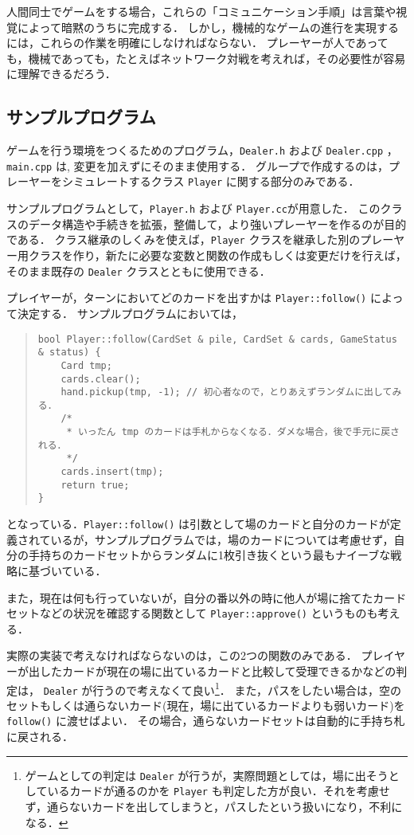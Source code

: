 人間同士でゲームをする場合，これらの「コミュニケーション手順」は言葉や視覚によって暗黙のうちに完成する．
しかし，機械的なゲームの進行を実現するには，これらの作業を明確にしなければならない．
プレーヤーが人であっても，機械であっても，たとえばネットワーク対戦を考えれば，その必要性が容易に理解できるだろう．


\subsection*{サンプルプログラム}
ゲームを行う環境をつくるためのプログラム，\verb+Dealer.h+ および \verb+Dealer.cpp+ ，\verb+main.cpp+ は, 変更を加えずにそのまま使用する．
グループで作成するのは，プレーヤーをシミュレートするクラス \verb+Player+ に関する部分のみである．

サンプルプログラムとして，\verb+Player.h+ および \verb+Player.cc+が用意した．
このクラスのデータ構造や手続きを拡張，整備して，より強いプレーヤーを作るのが目的である．
クラス継承のしくみを使えば，\verb+Player+ クラスを継承した別のプレーヤー用クラスを作り，新たに必要な変数と関数の作成もしくは変更だけを行えば，そのまま既存の \verb+Dealer+ クラスとともに使用できる．

プレイヤーが，ターンにおいてどのカードを出すかは \verb+Player::follow()+ によって決定する．
サンプルプログラムにおいては，
\begin{quote}
\begin{verbatim}
bool Player::follow(CardSet & pile, CardSet & cards, GameStatus & status) {
	Card tmp;
	cards.clear();
	hand.pickup(tmp, -1); // 初心者なので，とりあえずランダムに出してみる．
	/*
	 * いったん tmp のカードは手札からなくなる．ダメな場合，後で手元に戻される．
	 */
	cards.insert(tmp);
	return true;
}
\end{verbatim}
\end{quote}
となっている．\verb+Player::follow()+ は引数として場のカードと自分のカードが定義されているが，サンプルプログラムでは，場のカードについては考慮せず，自分の手持ちのカードセットからランダムに1枚引き抜くという最もナイーブな戦略に基づいている．

また，現在は何も行っていないが，自分の番以外の時に他人が場に捨てたカードセットなどの状況を確認する関数として \verb+Player::approve()+ というものも考える．
 
実際の実装で考えなければならないのは，この2つの関数のみである．
プレイヤーが出したカードが現在の場に出ているカードと比較して受理できるかなどの判定は， \verb+Dealer+ が行うので考えなくて良い\footnote{ゲームとしての判定は \verb+Dealer+ が行うが，実際問題としては，場に出そうとしているカードが通るのかを \verb+Player+ も判定した方が良い．それを考慮せず，通らないカードを出してしまうと，パスしたという扱いになり，不利になる．}．
また，パスをしたい場合は，空のセットもしくは通らないカード(現在，場に出ているカードよりも弱いカード)を \verb+follow()+ に渡せばよい．
その場合，通らないカードセットは自動的に手持ち札に戻される．

